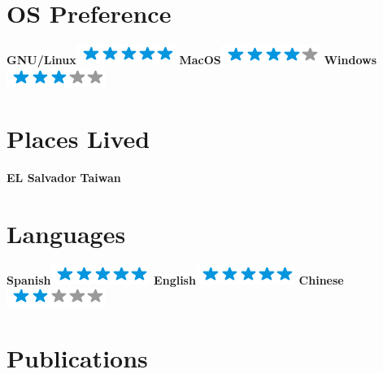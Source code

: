 \documentclass[a4paper]{friggeri-cv}
\begin{document}
\begin{aside}
~
~
~
  \section{OS Preference}
    \textbf{GNU/Linux}\includegraphics[scale=0.40]{img/5stars.png}
    \textbf{MacOS}\includegraphics[scale=0.40]{img/4stars.png}
    \textbf{Windows}\includegraphics[scale=0.40]{img/3stars.png}
    ~
  \section{Places Lived}
    \textbf{EL Salvador}
    \textbf{Taiwan}
    ~
  \section{Languages}
    \textbf{Spanish}\includegraphics[scale=0.40]{img/5stars.png}
    \textbf{English}\includegraphics[scale=0.40]{img/5stars.png}
    \textbf{Chinese}\includegraphics[scale=0.40]{img/2stars.png}
    ~
\end{aside}

\section{Publications}

\end{document}
